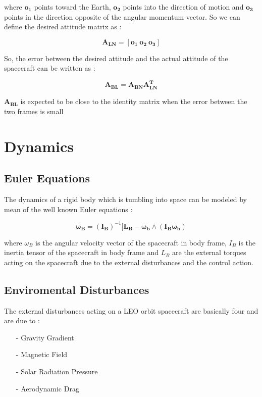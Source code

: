 \documentclass[11pt,a4paper]{report}
\begin{document}
where $\mathbf{o_1}$ points toward the Earth, $\mathbf{o_2}$ points into the direction of motion and $\mathbf{o_3}$ points in the direction opposite of the angular momentum vector.
So we can define the desired attitude matrix as : 

\begin{equation}
 \mathbf{A_{LN}} =  [\mathbf{o_1} \ \mathbf{o_2} \ \mathbf{o_3}]
\end{equation}

So, the error between the desired attitude and the actual attitude of the spacecraft can be written as : 

\begin{equation}
 \mathbf{A_{BL}} =  \mathbf{A_{BN}} \mathbf{A_{LN}^T}
\end{equation}

$\mathbf{A_{BL}}$ is expected to be close to the identity matrix when the error between the two frames is small
\section{Dynamics}
\subsection{Euler Equations}
The dynamics of a rigid body which is tumbling into space can be modeled by mean of the well known Euler equations : 

\begin{equation}
  \mathbf{\omega_B} = \mathbf{(I_B)}^{-1} [\mathbf{L_B} - \mathbf{\omega_b}  \wedge (\mathbf{I_B} \mathbf{\omega_b})
\end{equation}

where \textbf{$\omega_B$} is the angular velocity vector of the spacecraft in body frame, \textbf{$I_B$} is the inertia tensor of the spacecraft in body frame and \textbf{$L_B$} are the external torques acting on the spacecraft due to the external disturbances and the control action.

\subsection{Enviromental Disturbances}
The external disturbances acting on a LEO orbit spacecraft are basically four and are due to :

\begin{itemize}
  \item[-] Gravity Gradient
  \item[-] Magnetic Field 
  \item[-] Solar Radiation Pressure
  \item[-] Aerodynamic Drag
\end{itemize}
\end{document}
